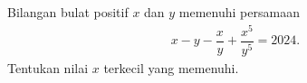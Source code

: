 Bilangan bulat positif $x$ dan $y$ memenuhi persamaan
\begin{align*}
    x-y-\dfrac{x}{y}+\dfrac{x^5}{y^5}=2024.
\end{align*}
Tentukan nilai $x$ terkecil yang memenuhi.